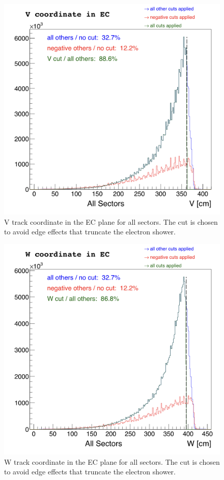 \clearpage
\begin{figure}[ht]
  \centering
		\includegraphics[width=0.7\textheight]{img/cut-07ECV_sector-all.png}
		\caption{V track coordinate in the EC plane for all sectors. The cut is chosen to avoid
              edge effects that truncate the electron shower.}
 		\label{fig:ECv}
\end{figure}

\clearpage
\begin{figure}[ht]
  \centering
		\includegraphics[width=0.7\textheight]{img/cut-08ECW_sector-all.png}
		\caption{W track coordinate in the EC plane for all sectors. The cut is chosen to avoid
              edge effects that truncate the electron shower.}
 		\label{fig:ECw}
\end{figure}


